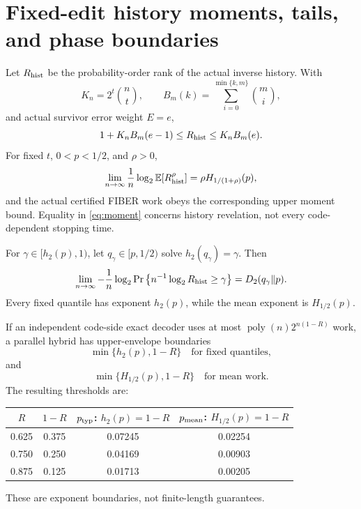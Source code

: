 \documentclass[11pt]{article}
\theoremstyle{definition}
\theoremstyle{remark}
\newcommand{\Rhist}{R_{\rm hist}}
\newcommand{\hbin}{h_2}
\newcommand{\Dkl}{D_2}
\newcommand{\poly}{\operatorname{poly}}
\begin{document}
\section{Fixed-edit history moments, tails, and phase boundaries}
Let $\Rhist$ be the probability-order rank of the actual inverse history.  With
\[
K_n=2^t\binom nt,\qquad B_m(k)=\sum_{i=0}^{\min\{k,m\}}\binom mi,
\]
and actual survivor error weight $E=e$,
\[
1+K_nB_m(e-1)\le\Rhist\le K_nB_m(e).
\]
For fixed $t$, $0<p<1/2$, and $\rho>0$,
\begin{equation}
\lim_{n\to\infty}\frac1n\log_2\mathbb E[\Rhist^\rho]
=\rho H_{1/(1+\rho)}(p),
\label{eq:moment}
\end{equation}
and the actual certified FIBER work obeys the corresponding upper moment bound.  Equality in \eqref{eq:moment} concerns history revelation, not every code-dependent stopping time.

For $\gamma\in[\hbin(p),1)$, let $q_\gamma\in[p,1/2)$ solve $\hbin(q_\gamma)=\gamma$.  Then
\[
\lim_{n\to\infty}-\frac1n\log_2\Pr\left\{n^{-1}\log_2\Rhist\ge\gamma\right\}
=\Dkl(q_\gamma\Vert p).
\]
Every fixed quantile has exponent $\hbin(p)$, while the mean exponent is $H_{1/2}(p)$.

If an independent code-side exact decoder uses at most $\poly(n)2^{n(1-R)}$ work, a parallel hybrid has upper-envelope boundaries
\[
\min\{\hbin(p),1-R\}
\quad\text{for fixed quantiles},
\]
and
\[
\min\{H_{1/2}(p),1-R\}
\quad\text{for mean work}.
\]
The resulting thresholds are:
\begin{center}
\begin{tabular}{@{}cccc@{}}
\toprule
$R$ & $1-R$ & $p_{\rm typ}$: $\hbin(p)=1-R$ & $p_{\rm mean}$: $H_{1/2}(p)=1-R$\\
\midrule
0.625 & 0.375 & 0.07245 & 0.02254\\
0.750 & 0.250 & 0.04169 & 0.00903\\
0.875 & 0.125 & 0.01713 & 0.00205\\
\bottomrule
\end{tabular}
\end{center}
These are exponent boundaries, not finite-length guarantees.
\end{document}
